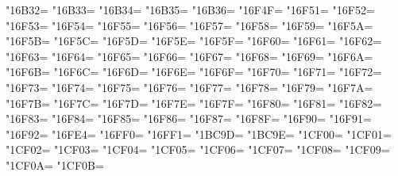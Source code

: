 \XeTeXcharclass"16B32=\KclassCM
\XeTeXcharclass"16B33=\KclassCM
\XeTeXcharclass"16B34=\KclassCM
\XeTeXcharclass"16B35=\KclassCM
\XeTeXcharclass"16B36=\KclassCM
\XeTeXcharclass"16F4F=\KclassCM
\XeTeXcharclass"16F51=\KclassCM
\XeTeXcharclass"16F52=\KclassCM
\XeTeXcharclass"16F53=\KclassCM
\XeTeXcharclass"16F54=\KclassCM
\XeTeXcharclass"16F55=\KclassCM
\XeTeXcharclass"16F56=\KclassCM
\XeTeXcharclass"16F57=\KclassCM
\XeTeXcharclass"16F58=\KclassCM
\XeTeXcharclass"16F59=\KclassCM
\XeTeXcharclass"16F5A=\KclassCM
\XeTeXcharclass"16F5B=\KclassCM
\XeTeXcharclass"16F5C=\KclassCM
\XeTeXcharclass"16F5D=\KclassCM
\XeTeXcharclass"16F5E=\KclassCM
\XeTeXcharclass"16F5F=\KclassCM
\XeTeXcharclass"16F60=\KclassCM
\XeTeXcharclass"16F61=\KclassCM
\XeTeXcharclass"16F62=\KclassCM
\XeTeXcharclass"16F63=\KclassCM
\XeTeXcharclass"16F64=\KclassCM
\XeTeXcharclass"16F65=\KclassCM
\XeTeXcharclass"16F66=\KclassCM
\XeTeXcharclass"16F67=\KclassCM
\XeTeXcharclass"16F68=\KclassCM
\XeTeXcharclass"16F69=\KclassCM
\XeTeXcharclass"16F6A=\KclassCM
\XeTeXcharclass"16F6B=\KclassCM
\XeTeXcharclass"16F6C=\KclassCM
\XeTeXcharclass"16F6D=\KclassCM
\XeTeXcharclass"16F6E=\KclassCM
\XeTeXcharclass"16F6F=\KclassCM
\XeTeXcharclass"16F70=\KclassCM
\XeTeXcharclass"16F71=\KclassCM
\XeTeXcharclass"16F72=\KclassCM
\XeTeXcharclass"16F73=\KclassCM
\XeTeXcharclass"16F74=\KclassCM
\XeTeXcharclass"16F75=\KclassCM
\XeTeXcharclass"16F76=\KclassCM
\XeTeXcharclass"16F77=\KclassCM
\XeTeXcharclass"16F78=\KclassCM
\XeTeXcharclass"16F79=\KclassCM
\XeTeXcharclass"16F7A=\KclassCM
\XeTeXcharclass"16F7B=\KclassCM
\XeTeXcharclass"16F7C=\KclassCM
\XeTeXcharclass"16F7D=\KclassCM
\XeTeXcharclass"16F7E=\KclassCM
\XeTeXcharclass"16F7F=\KclassCM
\XeTeXcharclass"16F80=\KclassCM
\XeTeXcharclass"16F81=\KclassCM
\XeTeXcharclass"16F82=\KclassCM
\XeTeXcharclass"16F83=\KclassCM
\XeTeXcharclass"16F84=\KclassCM
\XeTeXcharclass"16F85=\KclassCM
\XeTeXcharclass"16F86=\KclassCM
\XeTeXcharclass"16F87=\KclassCM
\XeTeXcharclass"16F8F=\KclassCM
\XeTeXcharclass"16F90=\KclassCM
\XeTeXcharclass"16F91=\KclassCM
\XeTeXcharclass"16F92=\KclassCM
\XeTeXcharclass"16FE4=\KclassCM
\XeTeXcharclass"16FF0=\KclassCM
\XeTeXcharclass"16FF1=\KclassCM
\XeTeXcharclass"1BC9D=\KclassCM
\XeTeXcharclass"1BC9E=\KclassCM
\XeTeXcharclass"1CF00=\KclassCM
\XeTeXcharclass"1CF01=\KclassCM
\XeTeXcharclass"1CF02=\KclassCM
\XeTeXcharclass"1CF03=\KclassCM
\XeTeXcharclass"1CF04=\KclassCM
\XeTeXcharclass"1CF05=\KclassCM
\XeTeXcharclass"1CF06=\KclassCM
\XeTeXcharclass"1CF07=\KclassCM
\XeTeXcharclass"1CF08=\KclassCM
\XeTeXcharclass"1CF09=\KclassCM
\XeTeXcharclass"1CF0A=\KclassCM
\XeTeXcharclass"1CF0B=\KclassCM
